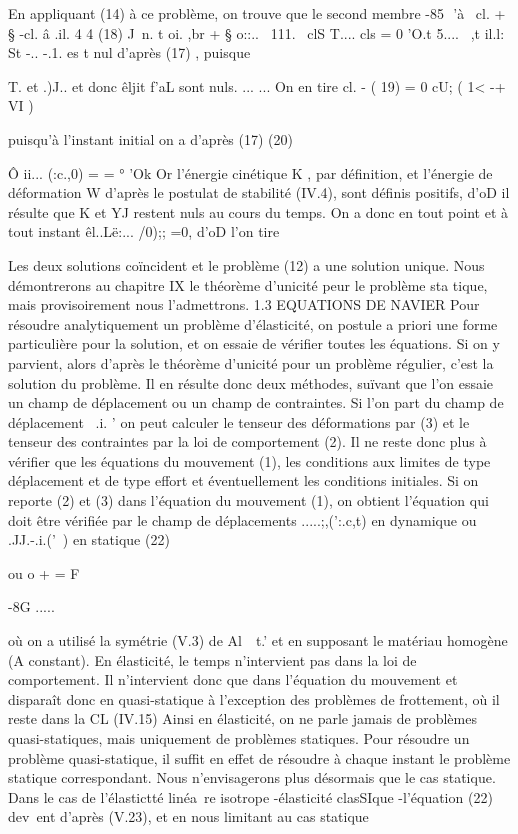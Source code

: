 En appliquant (14) à ce problème, on trouve que le second membre 
-85 ­
'à ~cl. + § -cl. â .il. 
4 4
(18) J~n. t oi. ,br + § o::..~ 111.~ clS T.... cls = 0 
'O.t 5.... ~,t il.l:
St 
-.. -.1. 
es t nul d'après (17) , puisque { T. et .)J.. et donc êljit f'aL sont nuls. 
... ... 
On en tire 
cl. -­
( 19) = 0
cU; ( 1< -+ VI ) 

puisqu'à l'instant initial on a d'après (17) 
(20) 

Ô ii... (:c.,0)
= 
= ° 
'Ok 
Or l'énergie cinétique K , par définition, et l'énergie de déformation W d'après le postulat de stabilité (IV.4), sont définis positifs, d'oD il ré­sulte que K et YJ restent nuls au cours du temps. On a donc en tout point et à tout instant êl..Lë:... /0);; =0, d'oD l'on tire 

Les deux solutions coïncident et le problème (12) a une solution unique. Nous démontrerons au chapitre IX le théorème d'unicité peur le problème sta­
tique, mais provisoirement nous l'admettrons. 
1.3 EQUATIONS DE NAVIER 
Pour résoudre analytiquement un problème d'élasticité, on postule 
a priori une forme particulière pour la solution, et on essaie de vérifier 
toutes les équations. Si on y parvient, alors d'après le théorème d'unicité pour un problème régulier, c'est la solution du problème. Il en résulte donc deux méthodes, suïvant que l'on essaie un champ de déplacement ou un champ de contraintes. 
Si l'on part du champ de déplacement ~.i. ' on peut calculer le tenseur des déformations par (3) et le tenseur des contraintes par la loi de comportement (2). Il ne reste donc plus à vérifier que les équations du mou­vement (1), les conditions aux limites de type déplacement et de type effort et éventuellement les conditions initiales. Si on reporte (2) et (3) dans l'équation du mouvement (1), on obtient l'équation qui doit être vérifiée par le champ de déplacements .....;,(':.c,t) en dynamique ou .JJ.-.i.('~) en statique 
(22) 

ou o
+ = 
F 

-8G ..... 

où on a utilisé la symétrie (V.3) de Al~~t.' et en supposant le matériau homogène (A constant). En élasticité, le temps n'intervient pas dans la loi de comportement. Il n'intervient donc que dans l'équation du mouvement et disparaît donc en quasi-statique à l'exception des problèmes de frot­tement, où il reste dans la CL (IV.15) Ainsi en élasticité, on ne parle jamais de problèmes quasi-statiques, mais uniquement de problèmes statiques. Pour résoudre un problème quasi-statique, il suffit en effet de résoudre à chaque instant le problème statique correspondant. Nous n'envisagerons plus désormais que le cas statique. 
Dans le cas de l'élastictté linéa~re isotrope -élasticité clas­SIque -l'équation (22) dev~ent d'après (V.23), et en nous limitant au cas statique 

}
